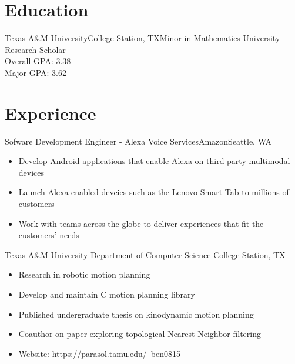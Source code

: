\documentclass[11pt,a4paper,sans]{moderncv}
\newcommand{\Rplus}{\protect\hspace{-.1em}\protect\raisebox{.35ex}{\smaller{\smaller\textbf{+}}}}
\newcommand{\Cpp}{\mbox{C\Rplus\Rplus}\xspace}
\newcommand{\spacing}{4pt}
\begin{document}
\makecvtitle

\vspace{-1em}


\section{Education}

\vspace{\spacing}

    {Texas A\&M University}{College Station, TX}{Minor in Mathematics}
    {University Research Scholar \\ Overall GPA: 3.38 \\ Major GPA: 3.62}

\section{Experience}

\vspace{\spacing}

  {Sofware Development Engineer - Alexa Voice Services}{Amazon}{Seattle, WA}{}
    {\vspace{3pt}
    \begin{itemize}
      \setlength{\itemindent}{1em}
      \item Develop Android applications that enable Alexa on third-party multimodal devices
      \item Launch Alexa enabled devcies such as the Lenovo Smart Tab to millions of customers
      \item Work with teams across the globe to deliver experiences that fit the customers' needs
    \end{itemize}
    }

\vspace{\spacing}

  {Texas A\&M University Department of Computer Science}
    {College Station, TX}{}{\vspace{3pt}
    \begin{itemize}
      \setlength{\itemindent}{1em}
      \item Research in robotic motion planning
      \item Develop and maintain \Cpp motion planning library
      \item Published undergraduate thesis on kinodynamic motion planning
      \item Coauthor on paper exploring topological Nearest-Neighbor filtering
      \item Website: https://parasol.tamu.edu/~ben0815
    \end{itemize}
    }
\end{document}
